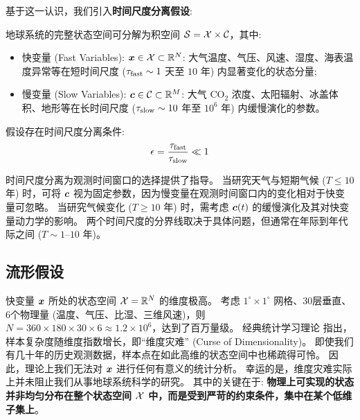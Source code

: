 基于这一认识，我们引入\textbf{时间尺度分离假设}:

\begin{assumption}[时间尺度分离]
\label{ass:timescale_separation}
    地球系统的完整状态空间可分解为积空间 $\mathcal{S} = \mathcal{X} \times \mathcal{C}$，其中:
    \begin{itemize}
        \item 快变量 (Fast Variables): $\bm{x} \in \mathcal{X} \subset \mathbb{R}^N$: 大气温度、气压、风速、湿度、海表温度异常等在短时间尺度 ($\tau_{\text{fast}} \sim 1$ 天至 $10$ 年) 内显著变化的状态分量;
        \item 慢变量 (Slow Variables): $\bm{c} \in \mathcal{C} \subset \mathbb{R}^M$: 大气 $\text{CO}_2$ 浓度、太阳辐射、冰盖体积、地形等在长时间尺度 ($\tau_{\text{slow}} \sim 10$ 年至 $10^6$ 年) 内缓慢演化的参数。
    \end{itemize}

    假设存在时间尺度分离条件:
    \begin{equation}
    \label{eq:timescale_separation}
        \epsilon = \frac{\tau_{\text{fast}}}{\tau_{\text{slow}}} \ll 1
    \end{equation}
\end{assumption}

时间尺度分离为观测时间窗口的选择提供了指导。
当研究天气与短期气候 ($T \leq 10$ 年) 时，可将 $\bm{c}$ 视为固定参数，因为慢变量在观测时间窗口内的变化相对于快变量可忽略。
当研究气候变化 ($T \geq 10$ 年) 时，需考虑 $\bm{c}(t)$ 的缓慢演化及其对快变量动力学的影响。
两个时间尺度的分界线取决于具体问题，但通常在年际到年代际之间 ($T \sim 1\text{--}10$ 年)。

\subsection{流形假设}
\label{sec:manifold_hypothesis}

快变量 $\bm{x}$ 所处的状态空间 $\mathcal{X} = \mathbb{R}^N$ 的维度极高。
考虑 $1^\circ \times 1^\circ$ 网格、30层垂直、6个物理量 (温度、气压、比湿、三维风速)，则 $N = 360 \times 180 \times 30 \times 6 \approx 1.2 \times 10^6$，达到了百万量级。
经典统计学习理论 \cite{vapnik1999nature} 指出，样本复杂度随维度指数增长，即“维度灾难” (Curse of Dimensionality)。
即使我们有几十年的历史观测数据，样本点在如此高维的状态空间中也稀疏得可怜。
因此，理论上我们无法对 $\bm{x}$ 进行任何有意义的统计分析。
幸运的是，维度灾难实际上并未阻止我们从事地球系统科学的研究。
其中的关键在于: \textbf{物理上可实现的状态并非均匀分布在整个状态空间 $\mathcal{X}$ 中，而是受到严苛的约束条件，集中在某个低维子集上}。

